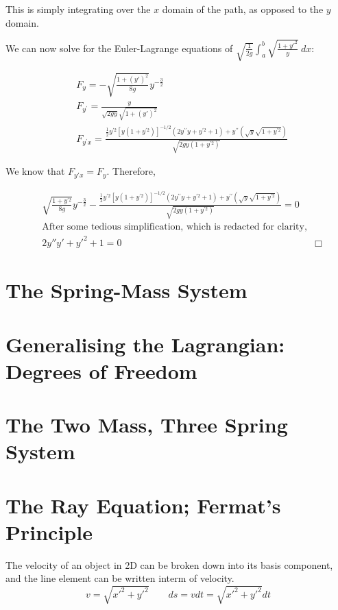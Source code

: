 \documentclass[%
 preprint,
 amsmath,amssymb,
 aps,
 pra,
 fleqn
]{revtex4-2}
\begin{document}
This is simply integrating over the $x$ domain of the path, as opposed to the $y$ domain.

We can now solve for the Euler-Lagrange equations of $\displaystyle \sqrt{\frac{1}{2g}} \int_a^b \sqrt{\frac{1 + y'^2}{y}} ~ dx$:

\begin{align*}
    &F_{y}=-\sqrt{\frac{1+(y')^2}{8 g}} y^{-\frac32}\\
    &F_{y^{\prime}}=\frac{y}{\sqrt{2 g y} \sqrt{1+(y')^2}}\\
    &F_{y^{\prime} x}=\frac{\frac{1}{2} y^{\prime 2}\left[y\left(1+y^{\prime 2}\right)\right]^{-1 / 2}\left(2 y^{\prime \prime} y+y^{\prime 2}+1\right)+y^{\prime \prime}(\sqrt{y} \sqrt{1+y^{\prime 2}})}{\sqrt{2 g y\left(1+y^{\prime 2}\right)}}
\end{align*}

We know that $F_{y'x} = F_y$.  Therefore, %

\begin{align*}
    &\sqrt{\frac{1+y^{\prime 2}}{8 g}} y^{-\frac{3}{2}}-\frac{\frac{1}{2} y^{\prime 2}\left[y\left(1+y^{\prime 2}\right)\right]^{-1 / 2}\left(2 y^{\prime \prime} y+y^{\prime 2}+1\right)+y^{\prime \prime}(\sqrt{y} \sqrt{1+y^{\prime 2}})}{\sqrt{2 g y\left(1+y^{\prime 2}\right)}}=0\\
    &\text{After some tedious simplification, which is redacted for clarity,}\\
    &2y''y' + y'^2 + 1 = 0 & \Box
\end{align*}

\section{The Spring-Mass System} %

\section{Generalising the Lagrangian: Degrees of Freedom} %

\section{The Two Mass, Three Spring System} %

\section{The Ray Equation; Fermat's Principle} %
The velocity of an object in 2D can be broken down into its basis component, and the line element can be written interm of velocity.
$$v = \sqrt{x'^2+y'^2}\qquad ds = vdt = \sqrt{x'^2+y'^2}dt$$
\end{document}
